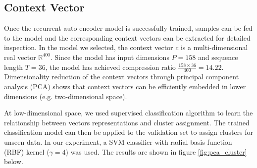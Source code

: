 \documentclass[runningheads]{llncs}
\begin{document}
\subsection{Context Vector}

Once the recurrent auto-encoder model is successfully trained, samples can be fed to the model and the corresponding context vectors can be extracted for detailed inspection. In the model we selected, the context vector \(c\) is a multi-dimensional real vector \(\mathbb{R}^{400}\). Since the model has input dimensions \(P=158\)  and sequence length \(T=36\), the model has achieved compression ratio \(\frac{158\times36}{400}=14.22\). Dimensionality reduction of the context vectors through principal component analysis (PCA) shows that context vectors can be efficiently embedded in lower dimensions (e.g. two-dimensional space).

At low-dimensional space, we used supervised classification algorithm to learn the relationship between vectors representations and cluster assignment. The trained classification model can then be applied to the validation set to assign clusters for unseen data. In our experiment, a SVM classifier with radial basis function (RBF) kernel (\(\gamma=4\)) was used. The results are shown in figure \ref{fig:pca_cluster} below.
\end{document}
